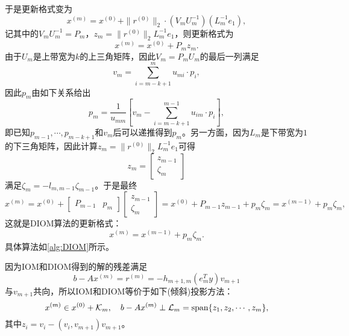 \documentclass[a4paper,10pt]{ctexart}
\begin{document}
\noindent 于是更新格式变为
\[
    x^{(m)} = x^{(0)} + \| r^{(0)} \|_2 \cdot (V_m U_m^{-1})(L_m^{-1}e_{1}),
\]
记其中的$ V_mU_m^{-1} = P_m $，$ z_m = \| r^{(0)} \|_2 L_m^{-1}e_1 $，则更新格式为
\begin{equation}
    x^{(m)} = x^{(0)} + P_m z_m.
\end{equation}
由于$ U_m $是上带宽为$ k $的上三角矩阵，因此$ V_m = P_mU_m $的最后一列满足
\[
    v_m = \sum_{i=m-k+1}^m u_{mi}\cdot p_i,
\]
因此$ p_m $由如下关系给出
\begin{equation}
    p_m = \frac{1}{u_{mm}} \left[ v_m - \sum_{i=m-k+1}^{m-1} u_{im}\cdot p_i \right] ,
\end{equation}
即已知$ p_{m-1},\cdots ,p_{m-k+1} $和$ v_m $后可以递推得到$ p_m $。另一方面，因为$ L_m $是下带宽为$ 1 $的下三角矩阵，因此计算$ z_m = \| r^{(0)} \|_2L_m^{-1}e_1 $可得
\begin{equation}
    z_m = 
    \begin{bmatrix} 
        z_{m-1} \\ \zeta_{m} 
    \end{bmatrix} 
\end{equation}
满足$ \zeta_{m} = -l_{m,m-1} \zeta_{m-1} $。于是最终
\[
    x^{(m)} = x^{(0)} + 
    \begin{bmatrix} 
        P_{m-1} & p_m
    \end{bmatrix}
    \begin{bmatrix} 
        z_{m-1} \\ \zeta_{m}
    \end{bmatrix} = 
    x^{(0)} + P_{m-1}z_{m-1} + p_m \zeta_{m} = x^{(m-1)} + p_m \zeta_{m},
\]
这就是DIOM算法的更新格式：
\begin{equation}
    x^{(m)} = x^{(m-1)} + p_m \zeta_{m}.
\end{equation}
具体算法如\ref{alg:DIOM}所示。

因为IOM和DIOM得到的解的残差满足
\[
    b - Ax^{(m)} = r^{(m)} = -h_{m+1,m}(e^T_m y) v_{m+1}
\]
与$ v_{m+1} $共向，所以IOM和DIOM等价于如下(倾斜)投影方法：
\begin{equation}
    x^{(m)} \in x^{(0)} + \mathcal{K}_m,\quad b - Ax^{(m)}\perp \mathcal{L}_m = {\rm span}\{z_1,z_2,\cdots ,z_m\},
\end{equation}
其中$ z_i = v_i - (v_i,v_{m+1})v_{m+1} $。
\end{document}
